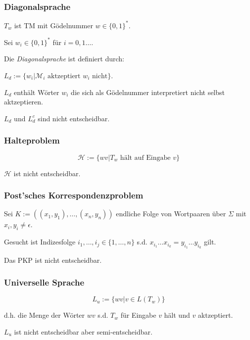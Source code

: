 \subsubsection*{Diagonalsprache}

$T_w$ ist TM mit Gödelnummer $w \in \{0,1\}^*$.

Sei $w_i \in \{0,1\}^*$ für $i = 0,1\dots$.

\spacing

Die \emph{Diagonalsprache} ist definiert durch:

$L_d := \{ w_i | \mathcal{M}_i \text{ aktzeptiert } w_i \text{ nicht} \}$.

$L_d$ enthält Wörter $w_i$ die sich als Gödelnummer interpretiert nicht selbst aktzeptieren.

\spacing

$L_d$ und $L_d^c$ sind nicht entscheidbar.

\subsubsection*{Halteproblem}

\[ \mathcal{H} := \{ wv | T_w \text{ hält auf Eingabe } v \} \]

$\mathcal{H}$ ist nicht entscheidbar.

\subsubsection*{Post'sches Korrespondenzproblem}

Sei $K := ((x_1,y_1),\dots,(x_n,y_n))$ endliche Folge von Wortpaaren über $\Sigma$ mit $x_i, y_i \neq \epsilon$.

\spacing

Gesucht ist Indizesfolge $i_1,\dots,i_j \in \{1,\dots,n\}$ s.d. $x_{i_1}\dots x_{i_k} = y_{i_1}\dots y_{i_k}$ gilt.

\spacing

Das PKP ist nicht entscheidbar.

\subsubsection*{Universelle Sprache}

\[ L_u := \{ wv | v \in L(T_w) \} \]

d.h. die Menge der Wörter $wv$ s.d. $T_w$ für Eingabe $v$ hält und $v$ aktzeptiert.

$L_u$ ist nicht entscheidbar aber semi-entscheidbar.

